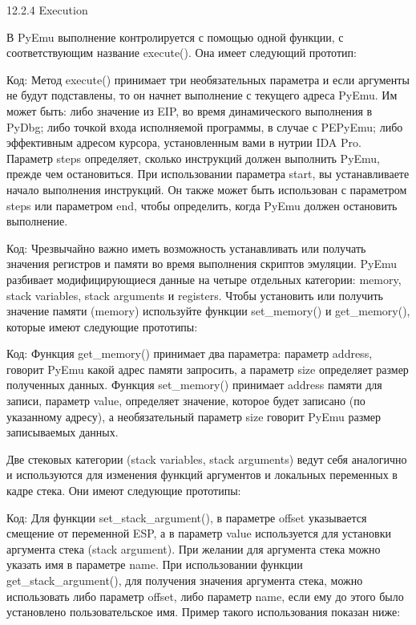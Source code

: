 \documentclass[12pt]{book}
\begin{document}
12.2.4 Execution

В PyEmu выполнение контролируется с помощью одной функции, с соответствующим название execute(). Она имеет следующий прототип:

Код:
Метод execute() принимает три необязательных параметра и если аргументы не будут подставлены, то он начнет выполнение с текущего адреса PyEmu. Им может быть: либо значение из EIP, во время динамического выполнения в PyDbg; либо точкой входа исполняемой программы, в случае с PEPyEmu; либо эффективным адресом курсора, установленным вами в нутрии IDA Pro. Параметр steps определяет, сколько инструкций должен выполнить PyEmu, прежде чем остановиться. При использовании параметра start, вы устанавливаете начало выполнения инструкций. Он также может быть использован с параметром steps или параметром end, чтобы определить, когда PyEmu должен остановить выполнение.

Код:
Чрезвычайно важно иметь возможность устанавливать или получать значения регистров и памяти во время выполнения скриптов эмуляции. PyEmu разбивает модифицирующиеся данные на четыре отдельных категории: memory, stack variables, stack arguments и registers. Чтобы установить или получить значение памяти (memory) используйте функции set\_memory() и get\_memory(), которые имеют следующие прототипы: 

Код:
Функция get\_memory() принимает два параметра: параметр address, говорит PyEmu какой адрес памяти запросить, а параметр size определяет размер полученных данных. Функция set\_memory() принимает address памяти для записи, параметр value, определяет значение, которое будет записано (по указанному адресу), а необязательный параметр size говорит PyEmu размер записываемых данных. 

Две стековых категории (stack variables, stack arguments) ведут себя аналогично и используются для изменения функций аргументов и локальных переменных в кадре стека. Они имеют следующие прототипы:

Код:
Для функции set\_stack\_argument(), в параметре offset указывается смещение от переменной ESP, а в параметр value используется для установки аргумента стека (stack argument). При желании для аргумента стека можно указать имя в параметре name. При использовании функции get\_stack\_argument(), для получения значения аргумента стека, можно использовать либо параметр offset, либо параметр name, если ему до этого было установлено пользовательское имя. Пример такого использования показан ниже:
\end{document}
